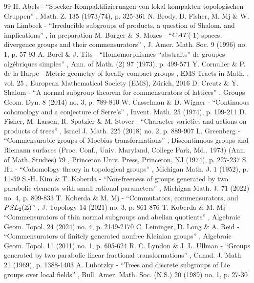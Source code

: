 \documentclass[11pt]{article}
\numberwithin{equation}{section}\providecommand{\llangle}{\langle\!\langle}\providecommand{\rrangle}{\rangle\!\rangle}\providecommand{\Asterisk}{\ast}
\theoremstyle{definition}
\begin{document}
\begin{thebibliography}{99}
 H. Abels - “Specker-Kompaktifizierungen von lokal kompakten topologischen Gruppen” , Math. Z. 135 (1973/74), p. 325-361
 N. Brody, D. Fisher, M. Mj \& W. van Limbeek - “Irreducible subgroups of products, a question of Shalom, and implications” , in preparation
 M. Burger \& S. Mozes - “${\rm CAT}$(-$1$)-spaces, divergence groups and their commensurators” , J. Amer. Math. Soc. 9 (1996) no. 1, p. 57-93
 A. Borel \& J. Tits - “Homomorphismes “abstraits” de groupes algébriques simples” , Ann. of Math. (2) 97 (1973), p. 499-571
 Y. Cornulier \& P. de la Harpe - Metric geometry of locally compact groups , EMS Tracts in Math. , vol. 25 , European Mathematical Society (EMS), Zürich, 2016
 D. Creutz \& Y. Shalom - “A normal subgroup theorem for commensurators of lattices” , Groups Geom. Dyn. 8 (2014) no. 3, p. 789-810
 W. Casselman \& D. Wigner - “Continuous cohomology and a conjecture of Serre’s” , Invent. Math. 25 (1974), p. 199-211
 D. Fisher, M. Larsen, R. Spatzier \& M. Stover - “Character varieties and actions on products of trees” , Israel J. Math. 225 (2018) no. 2, p. 889-907
 L. Greenberg - “Commensurable groups of Moebius transformations” , Discontinuous groups and Riemann surfaces (Proc. Conf., Univ. Maryland, College Park, Md., 1973) (Ann. of Math. Studies) 79 , Princeton Univ. Press, Princeton, NJ (1974), p. 227-237
 S. Hu - “Cohomology theory in topological groups” , Michigan Math. J. 1 (1952), p. 11-59
 S.-H. Kim \& T. Koberda - “Non-freeness of groups generated by two parabolic elements with small rational parameters” , Michigan Math. J. 71 (2022) no. 4, p. 809-833
 T. Koberda \& M. Mj - “Commutators, commensurators, and $\rm PSL_2(\mathbb{Z})$” , J. Topology 14 (2021) no. 3, p. 861-876
 T. Koberda \& M. Mj - “Commensurators of thin normal subgroups and abelian quotients” , Algebraic Geom. Topol. 24 (2024) no. 4, p. 2149-2170
 C. Leininger, D. Long \& A. Reid - “Commensurators of finitely generated nonfree Kleinian groups” , Algebraic Geom. Topol. 11 (2011) no. 1, p. 605-624
 R. C. Lyndon \& J. L. Ullman - “Groups generated by two parabolic linear fractional transformations” , Canad. J. Math. 21 (1969), p. 1388-1403
 A. Lubotzky - “Trees and discrete subgroups of Lie groups over local fields” , Bull. Amer. Math. Soc. (N.S.) 20 (1989) no. 1, p. 27-30

\end{thebibliography}
\end{document}
